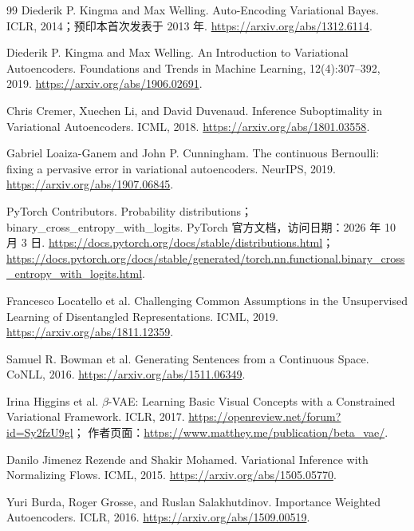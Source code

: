 \documentclass[UTF8,12pt,a4paper,fontset=fandol]{ctexart}
\begin{document}
\begin{thebibliography}{99}
Diederik P. Kingma and Max Welling.
Auto-Encoding Variational Bayes.
ICLR, 2014；预印本首次发表于 2013 年.
\url{https://arxiv.org/abs/1312.6114}.

Diederik P. Kingma and Max Welling.
An Introduction to Variational Autoencoders.
Foundations and Trends in Machine Learning, 12(4):307--392, 2019.
\url{https://arxiv.org/abs/1906.02691}.

Chris Cremer, Xuechen Li, and David Duvenaud.
Inference Suboptimality in Variational Autoencoders.
ICML, 2018.
\url{https://arxiv.org/abs/1801.03558}.

Gabriel Loaiza-Ganem and John P. Cunningham.
The continuous Bernoulli: fixing a pervasive error in variational autoencoders.
NeurIPS, 2019.
\url{https://arxiv.org/abs/1907.06845}.

PyTorch Contributors.
Probability distributions；binary\_cross\_entropy\_with\_logits.
PyTorch 官方文档，访问日期：2026 年 10 月 3 日.
\url{https://docs.pytorch.org/docs/stable/distributions.html}；
\url{https://docs.pytorch.org/docs/stable/generated/torch.nn.functional.binary_cross_entropy_with_logits.html}.

Francesco Locatello et al.
Challenging Common Assumptions in the Unsupervised Learning of Disentangled Representations.
ICML, 2019.
\url{https://arxiv.org/abs/1811.12359}.

Samuel R. Bowman et al.
Generating Sentences from a Continuous Space.
CoNLL, 2016.
\url{https://arxiv.org/abs/1511.06349}.

Irina Higgins et al.
$\beta$-VAE: Learning Basic Visual Concepts with a Constrained Variational Framework.
ICLR, 2017.
\url{https://openreview.net/forum?id=Sy2fzU9gl}；
作者页面：\url{https://www.matthey.me/publication/beta_vae/}.

Danilo Jimenez Rezende and Shakir Mohamed.
Variational Inference with Normalizing Flows.
ICML, 2015.
\url{https://arxiv.org/abs/1505.05770}.

Yuri Burda, Roger Grosse, and Ruslan Salakhutdinov.
Importance Weighted Autoencoders.
ICLR, 2016.
\url{https://arxiv.org/abs/1509.00519}.
\end{thebibliography}
\end{document}

